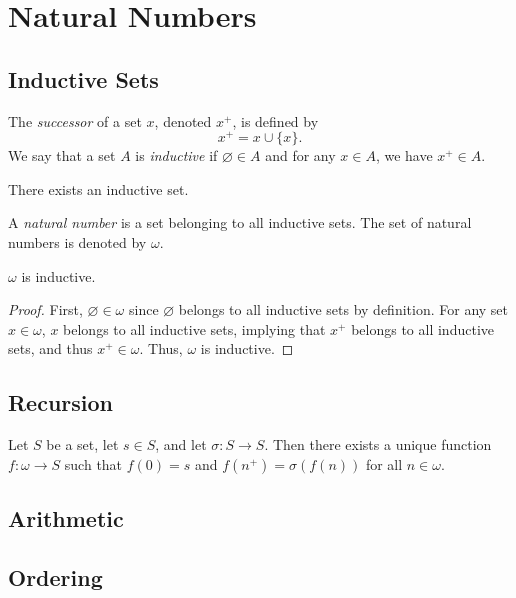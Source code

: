 \chapter{Natural Numbers}
\section{Inductive Sets}
\begin{definition}
  The \emph{successor} of a set $x$, denoted $x^+$, is defined by
  \begin{equation*}
    x^+ = x \cup \{x\}.
  \end{equation*}
  We say that a set $A$ is \emph{inductive} if $\varnothing \in A$ and for any
  $x \in A$, we have $x^+ \in A$.
\end{definition}

\begin{axiom}[Infinity]
  There exists an inductive set.
\end{axiom}

\begin{definition}
  A \emph{natural number} is a set belonging to all inductive sets.
  The set of natural numbers is denoted by $\omega$.
\end{definition}

\begin{theorem}
  $\omega$ is inductive.
\end{theorem}
\begin{proof}
  First, $\varnothing \in \omega$ since $\varnothing$ belongs to all inductive
  sets by definition.
  For any set $x \in \omega$, $x$ belongs to all inductive sets, implying that
  $x^+$ belongs to all inductive sets, and thus $x^+ \in \omega$.
  Thus, $\omega$ is inductive.
\end{proof}

\section{Recursion}
\begin{theorem}
  Let $S$ be a set, let $s \in S$, and let $\sigma: S \to S$.
  Then there exists a unique function $f: \omega \to S$ such that $f(0) = s$
  and $f(n^+) = \sigma(f(n))$ for all $n \in \omega$.
\end{theorem}

\section{Arithmetic}

\section{Ordering}